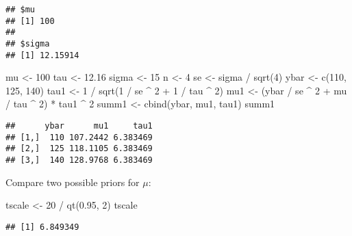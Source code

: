 \documentclass[
]{book}
\newenvironment{Shaded}{\begin{snugshade}}{\end{snugshade}}
\newcommand{\DecValTok}[1]{\textcolor[rgb]{0.00,0.00,0.81}{#1}}
\newcommand{\FloatTok}[1]{\textcolor[rgb]{0.00,0.00,0.81}{#1}}
\newcommand{\FunctionTok}[1]{\textcolor[rgb]{0.00,0.00,0.00}{#1}}
\newcommand{\NormalTok}[1]{#1}
\newcommand{\OtherTok}[1]{\textcolor[rgb]{0.56,0.35,0.01}{#1}}
\newcommand{\SpecialCharTok}[1]{\textcolor[rgb]{0.00,0.00,0.00}{#1}}
\begin{document}
\begin{verbatim}
## $mu
## [1] 100
## 
## $sigma
## [1] 12.15914
\end{verbatim}

\begin{Shaded}
\begin{Highlighting}[]
\NormalTok{mu }\OtherTok{\textless{}{-}} \DecValTok{100}
\NormalTok{tau }\OtherTok{\textless{}{-}} \FloatTok{12.16}
\NormalTok{sigma }\OtherTok{\textless{}{-}} \DecValTok{15}
\NormalTok{n }\OtherTok{\textless{}{-}} \DecValTok{4}
\NormalTok{se }\OtherTok{\textless{}{-}}\NormalTok{ sigma }\SpecialCharTok{/} \FunctionTok{sqrt}\NormalTok{(}\DecValTok{4}\NormalTok{)}
\NormalTok{ybar }\OtherTok{\textless{}{-}} \FunctionTok{c}\NormalTok{(}\DecValTok{110}\NormalTok{, }\DecValTok{125}\NormalTok{, }\DecValTok{140}\NormalTok{)}
\NormalTok{tau1 }\OtherTok{\textless{}{-}} \DecValTok{1} \SpecialCharTok{/} \FunctionTok{sqrt}\NormalTok{(}\DecValTok{1} \SpecialCharTok{/}\NormalTok{ se }\SpecialCharTok{\^{}} \DecValTok{2} \SpecialCharTok{+} \DecValTok{1} \SpecialCharTok{/}\NormalTok{ tau }\SpecialCharTok{\^{}} \DecValTok{2}\NormalTok{)}
\NormalTok{mu1 }\OtherTok{\textless{}{-}}\NormalTok{ (ybar }\SpecialCharTok{/}\NormalTok{ se }\SpecialCharTok{\^{}} \DecValTok{2} \SpecialCharTok{+}\NormalTok{ mu }\SpecialCharTok{/}\NormalTok{ tau }\SpecialCharTok{\^{}} \DecValTok{2}\NormalTok{) }\SpecialCharTok{*}\NormalTok{ tau1 }\SpecialCharTok{\^{}} \DecValTok{2}
\NormalTok{summ1 }\OtherTok{\textless{}{-}} \FunctionTok{cbind}\NormalTok{(ybar, mu1, tau1)}
\NormalTok{summ1}
\end{Highlighting}
\end{Shaded}

\begin{verbatim}
##      ybar      mu1     tau1
## [1,]  110 107.2442 6.383469
## [2,]  125 118.1105 6.383469
## [3,]  140 128.9768 6.383469
\end{verbatim}

Compare two possible priors for \(\mu\):

\begin{Shaded}
\begin{Highlighting}[]
\NormalTok{tscale }\OtherTok{\textless{}{-}} \DecValTok{20} \SpecialCharTok{/} \FunctionTok{qt}\NormalTok{(}\FloatTok{0.95}\NormalTok{, }\DecValTok{2}\NormalTok{)}
\NormalTok{tscale}
\end{Highlighting}
\end{Shaded}

\begin{verbatim}
## [1] 6.849349
\end{verbatim}
\end{document}
